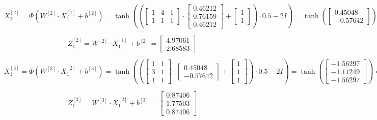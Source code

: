 \documentclass{article}
\begin{document}
\[ X^{[2]}_1 = \Phi(W^{[2]} \cdot X^{[1]}_1 + b^{[2]}) = \tanh \left( \left(\begin{bmatrix} 1 & 4 & 1 \\ 1 & 1 & 1 \end{bmatrix} \cdot \begin{bmatrix} 0.46212 \\ 0.76159 \\ 0.46212 \end{bmatrix} + \begin{bmatrix} 1 \\ 1 \end{bmatrix} \right) \cdot 0.5 - 2I \right) = \tanh \left( \begin{bmatrix} 0.45048 \\ -0.57642 \end{bmatrix} \right)  = \begin{bmatrix} 0.45048 \\ -0.57642 \end{bmatrix} \]

\[ Z^{[2]}_1 = W^{[2]} \cdot X^{[1]}_1 + b^{[2]} = \begin{bmatrix} 4.97061 \\ 2.68583 \end{bmatrix} \]

\[ X^{[3]}_1 = \Phi(W^{[3]} \cdot X^{[2]}_1 + b^{[3]}) = \tanh \left( \left(\begin{bmatrix} 1 & 1  \\ 3 & 1 \\ 1 & 1 \end{bmatrix} \cdot \begin{bmatrix} 0.45048 \\ -0.57642 \end{bmatrix} + \begin{bmatrix} 1 \\ 1 \\ 1 \end{bmatrix} \right) \cdot 0.5 - 2I \right) = \tanh \left( \begin{bmatrix} -1.56297 \\ -1.11249 \\ -1.56297 \end{bmatrix} \right)  = \begin{bmatrix} -0.9159 \\ -0.80494 \\ -0.9159 \end{bmatrix} \]

\[ Z^{[3]}_1 = W^{[3]} \cdot X^{[2]}_1 + b^{[3]} = \begin{bmatrix} 0.87406 \\ 1.77503 \\ 0.87406 \end{bmatrix} \]
\end{document}

